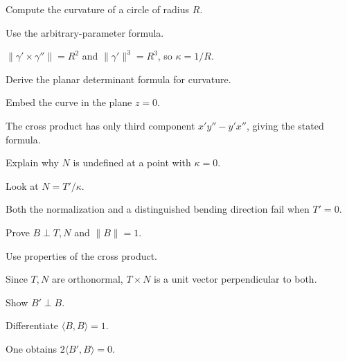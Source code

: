 \begin{exercise}\label{exr:vii13-03}
Compute the curvature of a circle of radius \(R\).
\end{exercise}
\begin{hint}
Use the arbitrary-parameter formula.
\end{hint}
\begin{solution}
\(\|\gamma'\times\gamma''\|=R^2\) and \(\|\gamma'\|^3=R^3\), so \(\kappa=1/R\).
\end{solution}

\begin{exercise}\label{exr:vii13-04}
Derive the planar determinant formula for curvature.
\end{exercise}
\begin{hint}
Embed the curve in the plane \(z=0\).
\end{hint}
\begin{solution}
The cross product has only third component \(x'y''-y'x''\), giving the stated formula.
\end{solution}

\begin{exercise}\label{exr:vii13-05}
Explain why \(N\) is undefined at a point with \(\kappa=0\).
\end{exercise}
\begin{hint}
Look at \(N=T'/\kappa\).
\end{hint}
\begin{solution}
Both the normalization and a distinguished bending direction fail when \(T'=0\).
\end{solution}

\begin{exercise}\label{exr:vii13-06}
Prove \(B\perp T,N\) and \(\|B\|=1\).
\end{exercise}
\begin{hint}
Use properties of the cross product.
\end{hint}
\begin{solution}
Since \(T,N\) are orthonormal, \(T\times N\) is a unit vector perpendicular to both.
\end{solution}

\begin{exercise}\label{exr:vii13-07}
Show \(B'\perp B\).
\end{exercise}
\begin{hint}
Differentiate \(\langle B,B\rangle=1\).
\end{hint}
\begin{solution}
One obtains \(2\langle B',B\rangle=0\).
\end{solution}


